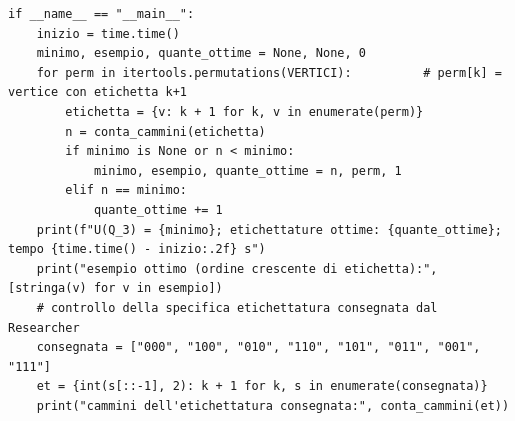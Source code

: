 \documentclass[11pt,a4paper]{article}
\begin{document}
\begin{lstlisting}[caption={certificati/q3\_verifica\_indipendente.py}]
if __name__ == "__main__":
    inizio = time.time()
    minimo, esempio, quante_ottime = None, None, 0
    for perm in itertools.permutations(VERTICI):          # perm[k] = vertice con etichetta k+1
        etichetta = {v: k + 1 for k, v in enumerate(perm)}
        n = conta_cammini(etichetta)
        if minimo is None or n < minimo:
            minimo, esempio, quante_ottime = n, perm, 1
        elif n == minimo:
            quante_ottime += 1
    print(f"U(Q_3) = {minimo}; etichettature ottime: {quante_ottime}; tempo {time.time() - inizio:.2f} s")
    print("esempio ottimo (ordine crescente di etichetta):", [stringa(v) for v in esempio])
    # controllo della specifica etichettatura consegnata dal Researcher
    consegnata = ["000", "100", "010", "110", "101", "011", "001", "111"]
    et = {int(s[::-1], 2): k + 1 for k, s in enumerate(consegnata)}
    print("cammini dell'etichettatura consegnata:", conta_cammini(et))

\end{lstlisting}
\end{document}
